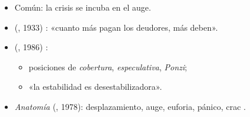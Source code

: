 \documentclass{article}
\begin{document}
\begin{columnas}
\begin{itemize}
\item Común: la crisis se incuba en el auge.
\item {} (, 1933) : «cuanto más pagan los deudores, más deben».
\item {} (, 1986) :
  \begin{itemize}
  \item posiciones de \emph{cobertura}, \emph{especulativa}, \emph{Ponzi};
  \item «la estabilidad es desestabilizadora».
  \end{itemize}
\item \emph{Anatomía} (, 1978): desplazamiento, auge, euforia, pánico, crac .
\end{itemize}


\end{columnas}
\end{document}
